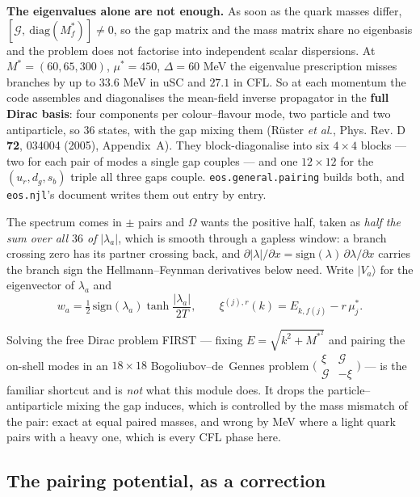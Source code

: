 \documentclass[11pt,a4paper]{article}
\newcommand{\Mstar}{M^{*}}
\newcommand{\mustar}{\mu^{*}}
\begin{document}
\textbf{The eigenvalues alone are not enough.} As soon as the quark masses
differ,
$\left[\mathcal G,\ \mathrm{diag}(\Mstar_f)\right]\neq0$, so the gap matrix and
the mass matrix share no eigenbasis and the problem does not factorise into
independent scalar dispersions. At $\Mstar=(60,65,300)$, $\mustar=450$,
$\Delta=60$ MeV the eigenvalue prescription misses branches by up to $33.6$ MeV
in uSC and $27.1$ in CFL. So at each momentum the code assembles and
diagonalises the mean-field inverse propagator in the \textbf{full Dirac
basis}: four components per colour--flavour mode, two particle and two
antiparticle, so $36$ states, with the gap mixing them (R\"uster \emph{et al.},
Phys. Rev. D \textbf{72}, 034004 (2005), Appendix~A). They block-diagonalise
into six $4\times4$ blocks --- two for each pair of modes a single gap couples
--- and one $12\times12$ for the $(u_r, d_g, s_b)$ triple all three gaps
couple. \texttt{eos.general.pairing} builds both, and \texttt{eos.njl}'s
document writes them out entry by entry.

The spectrum comes in $\pm$ pairs and $\Omega$ wants the positive half, taken
as \emph{half the sum over all $36$ of} $|\lambda_a|$, which is smooth through
a gapless window: a branch crossing zero has its partner crossing back, and
$\partial|\lambda|/\partial x = \mathrm{sign}(\lambda)\,\partial\lambda/
\partial x$ carries the branch sign the Hellmann--Feynman derivatives below
need. Write $|V_a\rangle$ for the eigenvector of $\lambda_a$ and
\begin{equation}
  w_a = \tfrac12\,\mathrm{sign}(\lambda_a)\tanh\frac{|\lambda_a|}{2T},
  \qquad
  \xi^{(j),r}(k) = E_{k,f(j)} - r\,\mustar_j .
  \label{eq:bdg}
\end{equation}

Solving the free Dirac problem FIRST --- fixing $E=\sqrt{k^2+\Mstar^2}$ and
pairing the on-shell modes in an $18\times18$ Bogoliubov--de~Gennes problem
$\big(\begin{smallmatrix}\xi & \mathcal G\\ \mathcal G & -\xi\end{smallmatrix}
\big)$ --- is the familiar shortcut and is \emph{not} what this module does. It
drops the particle--antiparticle mixing the gap induces, which is controlled by
the mass mismatch of the pair: exact at equal paired masses, and wrong by MeV
where a light quark pairs with a heavy one, which is every CFL phase here.

\subsection{The pairing potential, as a correction}
\end{document}
